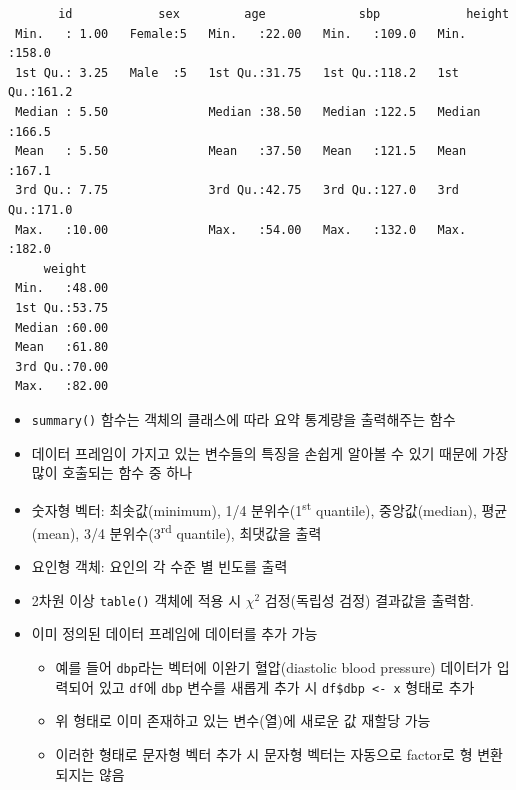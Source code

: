 \documentclass[
  11pt,
]{krantz}
\makeatletter
\providecommand{\tightlist}{%
  \setlength{\itemsep}{0pt}\setlength{\parskip}{0pt}}
\newenvironment{kframe}{%
\medskip{}
\setlength{\fboxsep}{.8em}
 \def\at@end@of@kframe{}%
 \ifinner\ifhmode%
  \def\at@end@of@kframe{\end{minipage}}%
  \begin{minipage}{\columnwidth}%
 \fi\fi%
 \def\FrameCommand##1{\hskip\@totalleftmargin \hskip-\fboxsep
 \colorbox{shadecolor}{##1}\hskip-\fboxsep
     \hskip-\linewidth \hskip-\@totalleftmargin \hskip\columnwidth}%
 \MakeFramed {\advance\hsize-\width
   \@totalleftmargin\z@ \linewidth\hsize
   \@setminipage}}%
 {\par\unskip\endMakeFramed%
 \at@end@of@kframe}
\newenvironment{rmdblock}[1]
  {
  \begin{itemize}
  \renewcommand{\labelitemi}{
    \raisebox{-.7\height}[0pt][0pt]{
      {\setkeys{Gin}{width=3em,keepaspectratio}\texttt{[image: images/\#1]}}
    }
  }
  \setlength{\fboxsep}{1em}
  \begin{kframe}
  \item
  }
  {
  \end{kframe}
  \end{itemize}
  }
\newenvironment{rmdtip}
  {\begin{rmdblock}{tip}}
  {\end{rmdblock}}
\makeatother
\begin{document}
\begin{verbatim}
       id            sex         age             sbp            height     
 Min.   : 1.00   Female:5   Min.   :22.00   Min.   :109.0   Min.   :158.0  
 1st Qu.: 3.25   Male  :5   1st Qu.:31.75   1st Qu.:118.2   1st Qu.:161.2  
 Median : 5.50              Median :38.50   Median :122.5   Median :166.5  
 Mean   : 5.50              Mean   :37.50   Mean   :121.5   Mean   :167.1  
 3rd Qu.: 7.75              3rd Qu.:42.75   3rd Qu.:127.0   3rd Qu.:171.0  
 Max.   :10.00              Max.   :54.00   Max.   :132.0   Max.   :182.0  
     weight     
 Min.   :48.00  
 1st Qu.:53.75  
 Median :60.00  
 Mean   :61.80  
 3rd Qu.:70.00  
 Max.   :82.00  
\end{verbatim}

\normalsize

\footnotesize

\begin{rmdtip}
\begin{itemize}
\tightlist
\item
  \texttt{summary()} 함수는 객체의 클래스에 따라 요약 통계량을 출력해주는 함수
\item
  데이터 프레임이 가지고 있는 변수들의 특징을 손쉽게 알아볼 수 있기 때문에 가장 많이 호출되는 함수 중 하나
\item
  숫자형 벡터: 최솟값(minimum), 1/4 분위수(1\textsuperscript{st} quantile), 중앙값(median), 평균(mean), 3/4 분위수(3\textsuperscript{rd} quantile), 최댓값을 출력
\item
  요인형 객체: 요인의 각 수준 별 빈도를 출력
\item
  2차원 이상 \texttt{table()} 객체에 적용 시 \(\chi^2\) 검정(독립성 검정) 결과값을 출력함.
\end{itemize}
\end{rmdtip}

\normalsize

\begin{itemize}
\tightlist
\item
  이미 정의된 데이터 프레임에 데이터를 추가 가능

  \begin{itemize}
  \tightlist
  \item
    예를 들어 \texttt{dbp}라는 벡터에 이완기 혈압(diastolic blood pressure) 데이터가 입력되어 있고 \texttt{df}에 \texttt{dbp} 변수를 새롭게 추가 시 \texttt{df\$dbp\ \textless{}-\ x} 형태로 추가
  \item
    위 형태로 이미 존재하고 있는 변수(열)에 새로운 값 재할당 가능
  \item
    이러한 형태로 문자형 벡터 추가 시 문자형 벡터는 자동으로 factor로 형 변환 되지는 않음
  \end{itemize}
\end{itemize}
\end{document}
